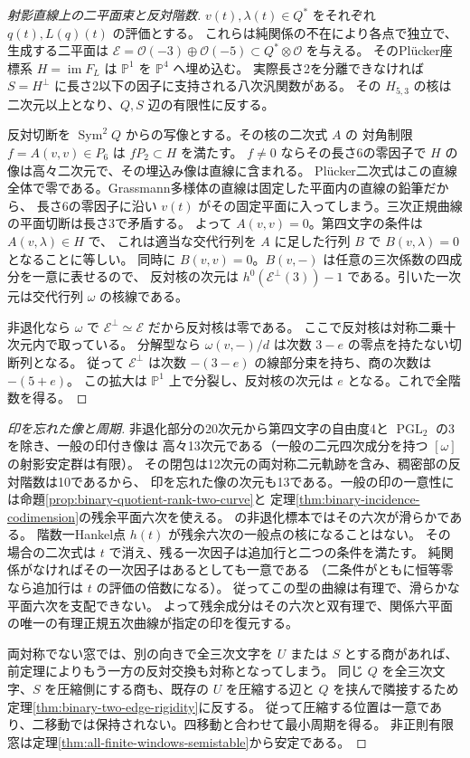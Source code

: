 \begin{proof}[射影直線上の二平面束と反対階数]
$v(t),\lambda(t)\in Q^*$ をそれぞれ $q(t),L(q)(t)$ の評価とする。
これらは純関係の不在により各点で独立で、生成する二平面は
$\mathcal E=\mathcal O(-3)\oplus\mathcal O(-5)\subset Q^*\otimes\mathcal O$ を与える。
そのPlücker座標系 $H=\operatorname{im}F_L$ は $\mathbb P^1$ を $\mathbb P^4$ へ埋め込む。
実際長さ2を分離できなければ $S=H^\perp$ に長さ2以下の因子に支持される八次汎関数がある。
その $H_{5,3}$ の核は二次元以上となり、$Q,S$ 辺の有限性に反する。

反対切断を $\operatorname{Sym}^2 Q$ からの写像とする。その核の二次式 $A$ の
対角制限 $f=A(v,v)\in P_6$ は $fP_2\subset H$ を満たす。
$f\ne0$ ならその長さ6の零因子で $H$ の像は高々二次元で、その埋込み像は直線に含まれる。
Plücker二次式はこの直線全体で零である。Grassmann多様体の直線は固定した平面内の直線の鉛筆だから、
長さ6の零因子に沿い $v(t)$ がその固定平面に入ってしまう。三次正規曲線の平面切断は長さ3で矛盾する。
よって $A(v,v)=0$。第四文字の条件は $A(v,\lambda)\in H$ で、
これは適当な交代行列を $A$ に足した行列 $B$ で $B(v,\lambda)=0$ となることに等しい。
同時に $B(v,v)=0$。$B(v,-)$ は任意の三次係数の四成分を一意に表せるので、
反対核の次元は $h^0(\mathcal E^\perp(3))-1$ である。引いた一次元は交代行列 $\omega$ の核線である。

非退化なら $\omega$ で $\mathcal E^\perp\simeq\mathcal E$ だから反対核は零である。
ここで反対核は対称二乗十次元内で取っている。
分解型なら $\omega(v,-)/d$ は次数 $3-e$ の零点を持たない切断列となる。
従って $\mathcal E^\perp$ は次数 $-(3-e)$ の線部分束を持ち、商の次数は $-(5+e)$。
この拡大は $\mathbb P^1$ 上で分裂し、反対核の次元は $e$ となる。これで全階数を得る。
\end{proof}
\begin{proof}[印を忘れた像と周期]
非退化部分の20次元から第四文字の自由度4と $\operatorname{PGL}_2$ の3を除き、一般の印付き像は
高々13次元である（一般の二元四次成分を持つ $[\omega]$ の射影安定群は有限）。
その閉包は12次元の両対称二元軌跡を含み、稠密部の反対階数は10であるから、
印を忘れた像の次元も13である。一般の印の一意性には命題\ref{prop:binary-quotient-rank-two-curve}と
定理\ref{thm:binary-incidence-codimension}の残余平面六次を使える。
の非退化標本ではその六次が滑らかである。
階数一Hankel点 $h(t)$ が残余六次の一般点の核になることはない。
その場合の二次式は $t$ で消え、残る一次因子は追加行と二つの条件を満たす。
純関係がなければその一次因子はあるとしても一意である
（二条件がともに恒等零なら追加行は $t$ の評価の倍数になる）。
従ってこの型の曲線は有理で、滑らかな平面六次を支配できない。
よって残余成分はその六次と双有理で、関係六平面の唯一の有理正規五次曲線が指定の印を復元する。

両対称でない窓では、別の向きで全三次文字を $U$ または $S$ とする商があれば、
前定理によりもう一方の反対交換も対称となってしまう。
同じ $Q$ を全三次文字、$S$ を圧縮側にする商も、既存の $U$ を圧縮する辺と
$Q$ を挟んで隣接するため定理\ref{thm:binary-two-edge-rigidity}に反する。
従って圧縮する位置は一意であり、二移動では保持されない。四移動と合わせて最小周期を得る。
非正則有限窓は定理\ref{thm:all-finite-windows-semistable}から安定である。
\end{proof}
